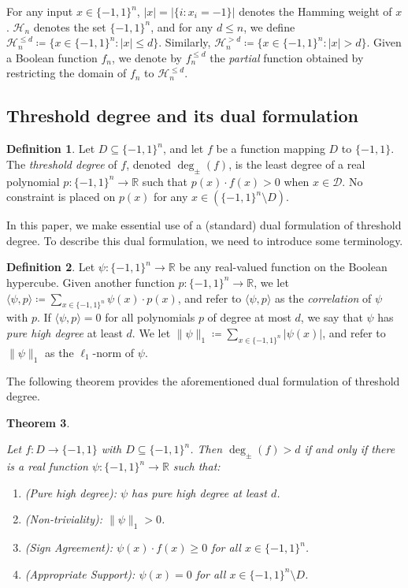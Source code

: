 \documentclass[11pt]{article}
\numberwithin{equation}{section}
\newtheorem{theorem}{Theorem}[section]
\theoremstyle{definition}
\newtheorem{definition}[theorem]{Definition}
\theoremstyle{plain}
\newcommand{\R}{\mathbb R}
\newcommand{\bits}{\{-1,1\}}
\begin{document}
For any input $x \in \bits^n$, $|x|=|\{i \colon x_i=-1\}|$ denotes the Hamming weight of $x$.
$\mathcal{H}_n$ denotes the set $\bits^n$, and 
for any $d \leq n$, we define $\mathcal{H}_n^{\leq d} \coloneqq  \{x \in \bits^n \colon |x| \leq d\}$.
Similarly,  $\mathcal{H}_n^{> d} \coloneqq  \{x \in \bits^n \colon |x| > d\}$.
Given a Boolean function $f_n$, we denote by $f_n^{\leq d}$ the \emph{partial} function obtained
by restricting the domain of $f_n$ to $\mathcal{H}_n^{\leq d}$.




\subsection{Threshold degree and its dual formulation}

\begin{definition} \label{def:tdeg}
	Let $D \subseteq \{-1, 1\}^n$, and let $f$ be a function mapping $D$ to $\{-1,1\}$.
	The \emph{threshold degree} of $f$, denoted $\deg_{\pm}(f)$, is the least degree of a real polynomial $p \colon \bits^n \to \R$ such that $p(x) \cdot f(x) > 0 $ when $x \in \mathcal{D}$.
	No constraint is placed on $p(x)$ for any $x \in (\bits^n \setminus D)$. 	
\end{definition}


In this paper, we make essential use of a (standard) dual formulation of threshold degree. To describe
this dual formulation, we need to introduce some terminology.

\begin{definition}
	Let $\psi \colon \bits^n \to \R$ be any real-valued function on the Boolean hypercube. 
	Given another function $p \colon \bits^n \to \R$, we let $\langle \psi, p\rangle \coloneqq  \sum_{x \in \bits^n} \psi(x) \cdot p(x)$,
	and refer to $\langle \psi, p\rangle$ as the \emph{correlation} of $\psi$ with $p$. 
	If $\langle \psi, p\rangle = 0$ for all polynomials $p$ of degree at most $d$, we say that $\psi$ has \emph{pure high degree} at least $d$.
	We let $\|\psi\|_1 \coloneqq  \sum_{x \in \bits^n} |\psi(x)|$, and refer to $\|\psi\|_1$ as the $\ell_1$-norm of $\psi$.
\end{definition}


The following theorem provides the aforementioned dual formulation of threshold degree.
\begin{theorem}\label{theorem:tdegdual}
	
	Let $f:D \to \{-1,1\}$ with $D \subseteq \{-1,1\}^n$. Then $\deg_{\pm}(f) > d$ if and only if there is a real function $\psi: \bits^n \to \R$ such that:
	\begin{enumerate}
		\item (Pure high degree): $\psi$ has pure high degree at least $d$.
		\item (Non-triviality): $\|\psi\|_1 > 0$.
		\item (Sign Agreement): $\psi(x) \cdot f(x) \ge 0$ for all $x \in \bits^n$.
		\item (Appropriate Support): $\psi(x)=0$ for all $x \in \bits^n \setminus D$.
	\end{enumerate}
\end{theorem}
\end{document}
